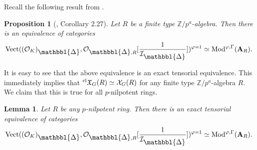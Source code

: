 \documentclass[10pt]{article}
\newtheorem{prop}[thm]{Proposition}
\newtheorem{lem}[thm]{Lemma}
\numberwithin{equation}{section}
\newcommand{\frakX}{{\mathfrak X}}
\newcommand{\bZ}{{\mathbb Z}}
\newcommand{\calI}{{\mathcal I}}
\newcommand{\calO}{{\mathcal O}}
\newcommand{\calX}{{\mathcal X}}
\newcommand{\Mod}{{\mathrm{Mod}}}           %
\newcommand{\Vect}{{\mathrm{Vect}}}         %
\newcommand{\bfA}{{\textbf{A}}}
\newcommand{\Prism}{{\mathlarger{\mathbbl{\Delta}}}} %
\begin{document}
Recall the following result from \cite{Min23}.

\begin{prop}[\cite{Min23}, Corollary 2.27]\label{finite type}
    Let $R$ be a finite type $\bZ/p^a$-algebra. Then there is an equivalence of categories
    \[
    \Vect((\calO_K)_{\Prism},\calO_{\Prism,R}[\frac{1}{\calI_{\Prism}}])^{\varphi=1}\simeq \Mod^{\varphi,\Gamma}(\bfA_R).
    \]
\end{prop}
It is easy to see that the above equivalence is an exact tensorial equivalence. This immediately implies that $^{\rm cl}\frakX_G(R)\simeq \calX_G(R)$ for any finite type $\bZ/p^a$-algebra $R$. We claim that this is true for all $p$-nilpotent rings.
\begin{lem}\label{all}
    Let $R$ be any $p$-nilpotent ring. Then there is an exact tensorial equivalence of categories
    \[
    \Vect((\calO_K)_{\Prism},\calO_{\Prism,R}[\frac{1}{\calI_{\Prism}}])^{\varphi=1}\simeq \Mod^{\varphi,\Gamma}(\bfA_R).
    \]
\end{lem}
\end{document}
